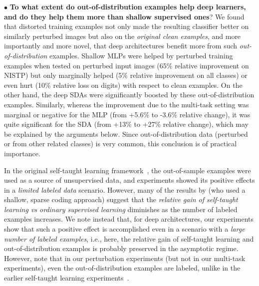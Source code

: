 \documentclass{article} %
\begin{document}
$\bullet$ %
{\bf To what extent do out-of-distribution examples help deep learners,
and do they help them more than shallow supervised ones}?
We found that distorted training examples not only made the resulting
classifier better on similarly perturbed images but also on
the {\em original clean examples}, and more importantly and more novel,
that deep architectures benefit more from such {\em out-of-distribution}
examples. Shallow MLPs were helped by perturbed training examples when tested on perturbed input 
images (65\% relative improvement on NISTP) 
but only marginally helped (5\% relative improvement on all classes) 
or even hurt (10\% relative loss on digits)
with respect to clean examples. On the other hand, the deep SDAs
were significantly boosted by these out-of-distribution examples.
Similarly, whereas the improvement due to the multi-task setting was marginal or
negative for the MLP (from +5.6\% to -3.6\% relative change), 
it was quite significant for the SDA (from +13\% to +27\% relative change),
which may be explained by the arguments below.
Since out-of-distribution data
(perturbed or from other related classes) is very common, this conclusion
is of practical importance.

In the original self-taught learning framework~\citep{RainaR2007}, the
out-of-sample examples were used as a source of unsupervised data, and
experiments showed its positive effects in a \emph{limited labeled data}
scenario. However, many of the results by \citet{RainaR2007} (who used a
shallow, sparse coding approach) suggest that the {\em relative gain of self-taught
learning vs ordinary supervised learning} diminishes as the number of labeled examples increases.
We note instead that, for deep
architectures, our experiments show that such a positive effect is accomplished
even in a scenario with a \emph{large number of labeled examples},
i.e., here, the relative gain of self-taught learning and
out-of-distribution examples is probably preserved
in the asymptotic regime. However, note that in our perturbation experiments
(but not in our multi-task experiments), 
even the out-of-distribution examples are labeled, unlike in the
earlier self-taught learning experiments~\citep{RainaR2007}.
\end{document}

